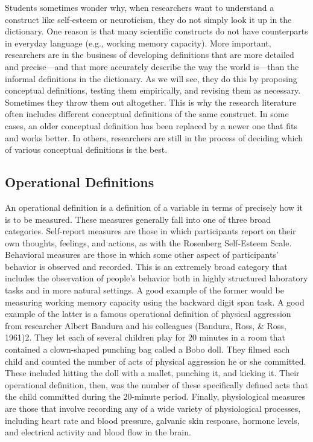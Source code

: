 Students sometimes wonder why, when researchers want to understand a construct like self-esteem or neuroticism, they do not simply look it up in the dictionary. One reason is that many scientific constructs do not have counterparts in everyday language (e.g., working memory capacity). More important, researchers are in the business of developing definitions that are more detailed and precise—and that more accurately describe the way the world is—than the informal definitions in the dictionary. As we will see, they do this by proposing conceptual definitions, testing them empirically, and revising them as necessary. Sometimes they throw them out altogether. This is why the research literature often includes different conceptual definitions of the same construct. In some cases, an older conceptual definition has been replaced by a newer one that fits and works better. In others, researchers are still in the process of deciding which of various conceptual definitions is the best.

\subsection{Operational Definitions}

An operational definition is a definition of a variable in terms of precisely how it is to be measured. These measures generally fall into one of three broad categories. Self-report measures are those in which participants report on their own thoughts, feelings, and actions, as with the Rosenberg Self-Esteem Scale. Behavioral measures are those in which some other aspect of participants' behavior is observed and recorded. This is an extremely broad category that includes the observation of people's behavior both in highly structured laboratory tasks and in more natural settings. A good example of the former would be measuring working memory capacity using the backward digit span task. A good example of the latter is a famous operational definition of physical aggression from researcher Albert Bandura and his colleagues (Bandura, Ross, \& Ross, 1961)2. They let each of several children play for 20 minutes in a room that contained a clown-shaped punching bag called a Bobo doll. They filmed each child and counted the number of acts of physical aggression he or she committed. These included hitting the doll with a mallet, punching it, and kicking it. Their operational definition, then, was the number of these specifically defined acts that the child committed during the 20-minute period. Finally, physiological measures are those that involve recording any of a wide variety of physiological processes, including heart rate and blood pressure, galvanic skin response, hormone levels, and electrical activity and blood flow in the brain.

